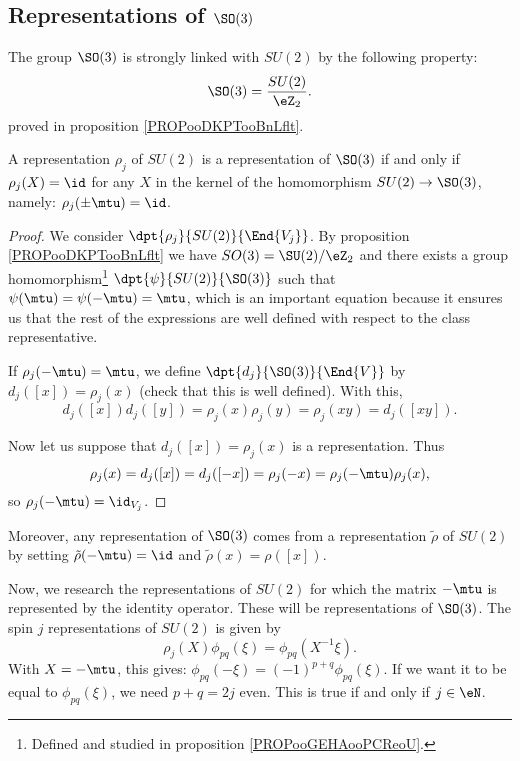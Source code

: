 \subsection{Representations of \texorpdfstring{$\SO(3)$}{SO3}}

The group $\SO(3)$ is strongly linked with $SU(2)$ by the following property:
\begin{equation}
   \SO(3)=\frac{SU(2)}{\eZ_2}.
\end{equation}
proved in proposition \ref{PROPooDKPTooBnLflt}.

\begin{lemma}\label{lem:SO_3}
    A representation $\rho_j$ of $SU(2)$ is a representation of $\SO(3)$ if and only if $\rho_j(X)=\id$ for any $X$ in the kernel of the homomorphism $SU(2)\to \SO(3)$, namely: $\rho_j(\pm\mtu)=\id$.
\end{lemma}

\begin{proof}
    We consider $\dpt{\rho_j}{SU(2)}{\End{V_j}}$. By proposition \ref{PROPooDKPTooBnLflt} we have \( SO(3)=\SU(2)/\eZ_2\) and there exists a group homomorphism\footnote{Defined and studied in proposition \ref{PROPooGEHAooPCReoU}.} $\dpt{\psi}{SU(2)}{\SO(3)}$ such that $\psi(\mtu)=\psi(-\mtu)=\mtu$, which is an important equation because it ensures us that the rest of the expressions are well defined with respect to the class representative.

    If $\rho_j(-\mtu)=\mtu$, we define $\dpt{d_j}{\SO(3)}{\End{V}}$ by $d_j([x])=\rho_j(x)$ (check that this is well defined). With this,
    \[
      d_j([x])d_j([y])=\rho_j(x)\rho_j(y)=\rho_j(xy)=d_j([xy]).
    \]

    Now let us suppose that $d_j([x])=\rho_j(x)$ is a representation. Thus
    \[
      \rho_j(x)=d_j([x])=d_j([-x])=\rho_j(-x)=\rho_j(-\mtu)\rho_j(x),
    \]
    so $\rho_j(-\mtu)=\id_{V_j}$.
\end{proof}

Moreover, any representation of $\SO(3)$ comes from a representation $\tilde\rho$ of $SU(2)$ by setting $\tilde\rho(-\mtu)=\id$ and $\tilde\rho(x)=\rho([x])$.

Now, we research the representations of $SU(2)$ for which the matrix $-\mtu$ is represented by the identity operator. These will be representations of $\SO(3)$. The spin $j$ representations of $SU(2)$ is given by
\begin{equation}
   \rho_j(X)\phi_{pq}(\xi)=\phi_{pq}(X^{-1}\xi).
\end{equation}
With $X=-\mtu$, this gives: $\phi_{pq}(-\xi)=(-1)^{p+q}\phi_{pq}(\xi)$. If we want it to be equal to $\phi_{pq}(\xi)$, we need $p+q=2j$ even. This is true if and only if $j\in\eN$.

